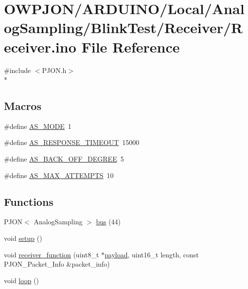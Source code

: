 \hypertarget{AnalogSampling_2BlinkTest_2Receiver_2Receiver_8ino}{\section{O\-W\-P\-J\-O\-N/\-A\-R\-D\-U\-I\-N\-O/\-Local/\-Analog\-Sampling/\-Blink\-Test/\-Receiver/\-Receiver.ino File Reference}
\label{AnalogSampling_2BlinkTest_2Receiver_2Receiver_8ino}
}
{\ttfamily \#include $<$P\-J\-O\-N.\-h$>$}\\*
\subsection*{Macros}
\begin{DoxyCompactItemize}
\item 
\#define \hyperlink{AnalogSampling_2BlinkTest_2Receiver_2Receiver_8ino_a4e74dbda50d34621af93621e67294482}{A\-S\-\_\-\-M\-O\-D\-E}~1
\item 
\#define \hyperlink{AnalogSampling_2BlinkTest_2Receiver_2Receiver_8ino_ab93065a204a9cfd4c1857a3ae70eb93a}{A\-S\-\_\-\-R\-E\-S\-P\-O\-N\-S\-E\-\_\-\-T\-I\-M\-E\-O\-U\-T}~15000
\item 
\#define \hyperlink{AnalogSampling_2BlinkTest_2Receiver_2Receiver_8ino_ae52002e6f7038dfa1b1233b8c8f8fffe}{A\-S\-\_\-\-B\-A\-C\-K\-\_\-\-O\-F\-F\-\_\-\-D\-E\-G\-R\-E\-E}~5
\item 
\#define \hyperlink{AnalogSampling_2BlinkTest_2Receiver_2Receiver_8ino_ac34d08b3c89dbfda92dec678ab6a7a2e}{A\-S\-\_\-\-M\-A\-X\-\_\-\-A\-T\-T\-E\-M\-P\-T\-S}~10
\end{DoxyCompactItemize}
\subsection*{Functions}
\begin{DoxyCompactItemize}
\item 
P\-J\-O\-N$<$ Analog\-Sampling $>$ \hyperlink{AnalogSampling_2BlinkTest_2Receiver_2Receiver_8ino_ae99b22688af56bff137f8417dd489c0e}{bus} (44)
\item 
void \hyperlink{AnalogSampling_2BlinkTest_2Receiver_2Receiver_8ino_a4fc01d736fe50cf5b977f755b675f11d}{setup} ()
\item 
void \hyperlink{AnalogSampling_2BlinkTest_2Receiver_2Receiver_8ino_a76fc5e73c141f748dcc1809fdcfa1714}{receiver\-\_\-function} (uint8\-\_\-t $\ast$\hyperlink{Uno__Dragino__LoRa__GPS__Shield__TTN_8ino_a78a402d1762842473567de90b11ed256}{payload}, uint16\-\_\-t length, const P\-J\-O\-N\-\_\-\-Packet\-\_\-\-Info \&packet\-\_\-info)
\item 
void \hyperlink{AnalogSampling_2BlinkTest_2Receiver_2Receiver_8ino_afe461d27b9c48d5921c00d521181f12f}{loop} ()
\end{DoxyCompactItemize}


